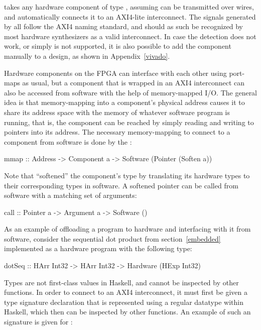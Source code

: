 \documentclass[../paper.tex]{subfiles}
\begin{document}
 takes any hardware component of type , assuming  can be transmitted over wires, and automatically connects it to an AXI4-lite interconnect. The signals generated by  all follow the AXI4 naming standard, and should as such be recognized by most hardware synthesizers as a valid interconnect. In case the detection does not work, or simply is not supported, it is also possible to add the component manually to a design, as shown in Appendix~\ref{vivado}.

Hardware components on the FPGA can interface with each other using port-maps as usual, but a component that is wrapped in an AXI4 interconnect can also be accessed from software with the help of memory-mapped I/O. The general idea is that memory-mapping into a component's physical address causes it to share its address space with the memory of whatever software program is running, that is, the component can be reached by simply reading and writing to pointers into its address. The necessary memory-mapping to connect to a component from software is done by the :

\begin{code}
mmap :: Address -> Component a -> Software (Pointer (Soften a))
\end{code}

\noindent Note that  ``softened'' the component's type by translating its hardware types to their corresponding types in software. A softened pointer can be called from software with a matching set of arguments:

\begin{code}
call :: Pointer a -> Argument a -> Software ()
\end{code}

As an example of offloading a program to hardware and interfacing with it from software, consider the sequential dot product from section~\ref{embedded} implemented as a hardware program with the following type:

\begin{code}
dotSeq :: HArr Int32 -> HArr Int32 -> Hardware (HExp Int32)
\end{code}

\noindent Types are not first-class values in Haskell, and cannot be inspected by other functions. In order to connect  to an AXI4 interconnect, it must first be given a type signature declaration that is represented using a regular datatype within Haskell, which then can be inspected by other functions. An example of such an signature is given for :
\end{document}
